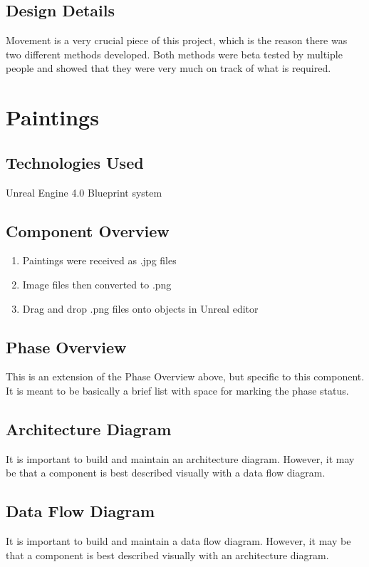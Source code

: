 \subsection{Design Details}
Movement is a very crucial piece of this project, which is the reason there was two different methods developed.  Both methods were beta tested by multiple people and showed that they were very much on track of what is required. 




\section{Paintings }

\subsection{Technologies  Used}
Unreal Engine 4.0 Blueprint system

\subsection{Component  Overview}
\begin{enumerate}
\item Paintings were received as .jpg files
\item Image files then converted to .png
\item Drag and drop .png files onto objects in Unreal editor
\end{enumerate}

\subsection{Phase Overview}
This is an extension of the Phase Overview above, but specific to this component. 
 It is meant to be basically a brief list with space for marking the phase status. 

\subsection{ Architecture  Diagram}
It is important to build and maintain an architecture diagram.  However, it may 
be that a component is best described visually with a data flow diagram. 


\subsection{Data Flow Diagram}
It is important to build and maintain a data flow diagram.  However, it may be 
that a component is best described visually with an architecture diagram. 


